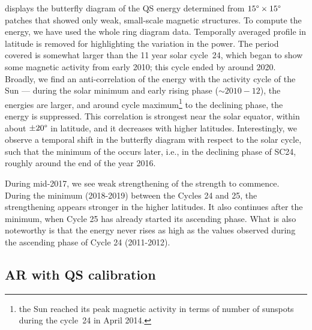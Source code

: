\documentclass{aa}
\begin{document}
 displays the butterfly diagram of the QS
\fff energy determined
from $15\degree \times 15\degree$ patches that showed only weak, small-scale magnetic structures.
To compute the \fff 
energy, we have used the whole ring diagram data.
Temporally averaged profile in latitude is removed for highlighting the variation in the
\fff power. The period covered is somewhat larger than the 11 year solar cycle~24, which
began to show some magnetic activity from early 2010; this cycle ended by around 2020.
Broadly, we find an anti-correlation of the \fff 
energy with the activity cycle of the
Sun --- during the solar minimum and early rising phase ($\sim 2010-12$), the \fff 
energies
are larger, and around cycle maximum\footnote{the Sun reached its peak magnetic activity
in terms of number of sunspots during the cycle~24 in April 2014.} to the declining phase,
the \fff 
energy 
is suppressed.
This correlation is strongest near the solar equator, within about $\pm 20\degree$ in
latitude, and it decreases with higher latitudes.
Interestingly, we observe a temporal shift in the \fff butterfly diagram with respect to the
solar cycle, such that the minimum of the \fff occurs later, i.e., in the declining phase of
SC24, roughly around the end of the year 2016.


During mid-2017, we see weak strengthening of the \fff strength to commence. During the minimum (2018-2019) between the Cycles 24 and 25, the strengthening appears stronger in the higher latitudes. It also continues after the minimum, when Cycle 25 has already started its ascending phase. What is also noteworthy is that the \fff 
energy
never rises as high as the values observed during the ascending phase of Cycle 24 (2011-2012).

\subsection{AR \fff with QS calibration}\label{arf}
\end{document}
